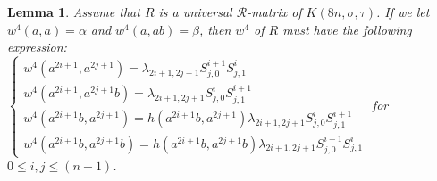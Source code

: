 \documentclass[a4paper,11pt]{amsart}
\numberwithin{equation}{section}
\newtheorem{lemma}[theorem]{Lemma}
\begin{document}
\begin{lemma}\label{all.2}
Assume that $R$ is a universal $\mathcal{R}$-matrix of $K(8n,\sigma,\tau)$. If we let $w^4(a,a)=\alpha$ and $w^4(a,ab)=\beta$, then $w^4$ of $R$ must have the following expression: \\[1.5mm]
$ \left\{
\begin{array}{l}
w^4(a^{2i+1},a^{2j+1})=\lambda_{2i+1,2j+1}S_{j,0}^{i+1}S_{j,1}^{i}\\
w^4(a^{2i+1},a^{2j+1}b)=\lambda_{2i+1,2j+1}S_{j,0}^{i}S_{j,1}^{i+1}\\
w^4(a^{2i+1}b,a^{2j+1})=h(a^{2i+1}b,a^{2j+1})\lambda_{2i+1,2j+1}S_{j,0}^{i}S_{j,1}^{i+1}\\
w^4(a^{2i+1}b,a^{2j+1}b)=h(a^{2i+1}b,a^{2j+1}b)\lambda_{2i+1,2j+1}S_{j,0}^{i+1}S_{j,1}^{i}
\end{array} \right.$
for $0\leq i,j \leq (n-1)$.
\end{lemma}
\end{document}
